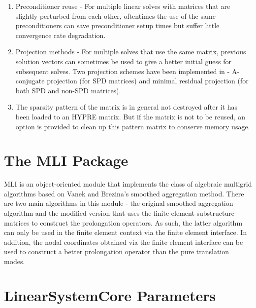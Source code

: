 \begin{enumerate}
\item Preconditioner reuse - For multiple linear solves with matrices that are
      slightly perturbed from each other, oftentimes the use of the same
      preconditioners can save preconditioner setup times but suffer little
      convergence rate degradation.
\item Projection methods - For multiple solves that use the same matrix,
      previous solution vectors can sometimes be used to give a better initial
      guess for subsequent solves.  Two projection schemes have been implemented
      in \hypre{} - A-conjugate projection (for SPD matrices) and minimal residual
      projection (for both SPD and non-SPD matrices).
\item The sparsity pattern of the matrix is in general not destroyed after
      it has been loaded to an HYPRE matrix.  But if the matrix is not to
      be reused, an option is provided to clean up this pattern matrix to
      conserve memory usage.
\end{enumerate}
                                                                                
\section{The MLI Package}
                                                                                
MLI is an object-oriented module that implements the class of algebraic
multigrid algorithms based on Vanek and Brezina's smoothed aggregation
method.  There are two main algorithms in this module - the original
smoothed aggregation algorithm and the modified version that uses
the finite element substructure matrices to construct the prolongation
operators.  As such, the latter algorithm can only be used in the
finite element context via the finite element interface.  In addition,
the nodal coordinates obtained via the finite element interface can be
used to construct a better prolongation operator than the pure
translation modes.
                                                                                
\section{\hypre{} {\sf LinearSystemCore} Parameters}
                                                                                
